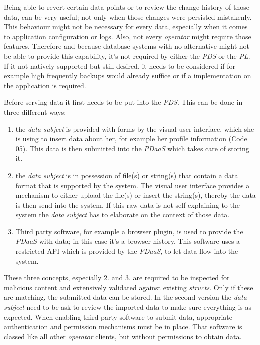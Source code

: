 \documentclass[12pt,english,a4paper,titlepage,cleardoublepage=empty,dottedtoc]{report}
\providecommand{\tightlist}{%
  \setlength{\itemsep}{0pt}\setlength{\parskip}{0pt}}
\begin{document}
Being able to revert certain data points or to review the change-history
of those data, can be very useful; not only when those changes were
persisted mistakenly. This behaviour might not be necessary for every
data, especially when it comes to application configuration or logs.
Also, not every \emph{operator} might require those features. Therefore
and because database systems with no alternative might not be able to
provide this capability, it's not required by either the \emph{PDS} or
the \emph{PL}. If it not natively supported but still desired, it needs
to be considered if for example high frequently backups would already
suffice or if a implementation on the application is required.

Before serving data it first needs to be put into the \emph{PDS}. This
can be done in three different ways:

\begin{enumerate}
\def\labelenumi{\arabic{enumi}.}
\tightlist
\item
  the \emph{data subject} is provided with forms by the visual user
  interface, which she is using to insert data about her, for example
  her \protect\hyperlink{code-05_struct_profile}{profile information
  (Code 05)}. This data is then submitted into the \emph{PDaaS} which
  takes care of storing it.
\item
  the \emph{data subject} is in possession of file(s) or string(s) that
  contain a data format that is supported by the system. The visual user
  interface provides a mechanism to either upload the file(s) or insert
  the string(s), thereby the data is then send into the system. If this
  raw data is not self-explaining to the system the \emph{data subject}
  has to elaborate on the context of those data.
\item
  Third party software, for example a browser plugin, is used to provide
  the \emph{PDaaS} with data; in this case it's a browser history. This
  software uses a restricted API which is provided by the \emph{PDaaS},
  to let data flow into the system.
\end{enumerate}

These three concepts, especially 2. and 3. are required to be inspected
for malicious content and extensively validated against existing
\emph{structs}. Only if these are matching, the submitted data can be
stored. In the second version the \emph{data subject} need to be ask to
review the imported data to make sure everything is as expected. When
enabling third party software to submit data, appropriate authentication
and permission mechanisms must be in place. That software is classed
like all other \emph{operator} clients, but without permissions to
obtain data.
\end{document}
